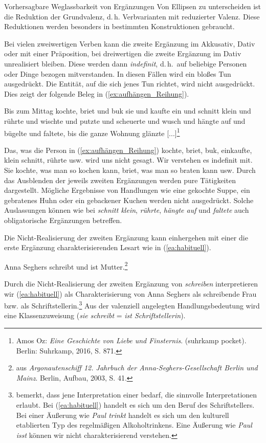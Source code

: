 \begin{Exkurs}{Vorhersagbare Weglassbarkeit von Ergänzungen}
Von Ellipsen zu unterscheiden ist die Reduktion der Grundvalenz, d.\,h. Verbvarianten mit reduzierter Valenz. Diese Reduktionen werden besonders in bestimmten Konstruktionen gebraucht.

Bei vielen zweiwertigen Verben kann die zweite Ergänzung im Akkusativ, Dativ oder mit einer Präposition, bei dreiwertigen die zweite Ergänzung im Dativ unrealisiert bleiben. Diese werden dann \textit{indefinit}, d.\,h.\ auf beliebige Personen oder Dinge bezogen mitverstanden. In diesen Fällen wird ein bloßes Tun ausgedrückt. Die Entität, auf die sich jenes Tun richtet, wird nicht ausgedrückt. Dies zeigt der folgende Beleg in (\ref{ex:aufhängen_Reihung}).

\ea \label{ex:aufhängen_Reihung} Bis zum Mittag kochte, briet und buk sie und kaufte ein und schnitt klein und rührte und wischte und putzte und scheuerte und wusch und hängte auf und bügelte und faltete, bis die ganze Wohnung glänzte [...]\footnote{Amos Oz: \textit{Eine Geschichte von Liebe und Finsternis}. (suhrkamp pocket). Berlin: Suhrkamp, 2016, S. 871.}
\z 

Das, was die Person in (\ref{ex:aufhängen_Reihung}) kochte, briet, buk, einkaufte, klein schnitt, rührte usw. wird uns nicht gesagt. Wir verstehen es indefinit mit. Sie kochte, was man so kochen kann, briet, was man so braten kann usw. Durch das Ausblenden der jeweils zweiten Ergänzungen werden pure Tätigkeiten dargestellt. Mögliche Ergebnisse von Handlungen wie eine gekochte Suppe, ein gebratenes Huhn oder ein gebackener Kuchen werden nicht ausgedrückt. Solche Auslassungen können wie bei \textit{schnitt klein}, \textit{rührte}, \textit{hängte auf} und \textit{faltete} auch obligatorische Ergänzungen betreffen.  

Die Nicht-Realisierung der zweiten Ergänzung kann einhergehen mit einer die erste Ergänzung charakterisierenden Lesart wie in (\ref{ea:habituell}).

\ea \label{ea:habituell} Anna Seghers schreibt und ist Mutter.\footnote{aus \textit{Argonautenschiff 12. Jahrbuch der Anna-Seghers-Gesellschaft Berlin und Mainz}. Berlin, Aufbau, 2003, S. 41.}
\z 

Durch die Nicht-Realisierung der zweiten Ergänzung von \textit{schreiben} interpretieren wir (\ref{ea:habituell}) als Charakterisierung von Anna Seghers als schreibende Frau bzw. als Schriftstellerin.\footnote{\citet[255]{Agel2000} bemerkt, dass jene Interpretation einer  bedarf, die sinnvolle Interpretationen erlaubt. Bei (\ref{ea:habituell}) handelt es sich um den Beruf des Schriftstellers. Bei einer Äußerung wie \textit{Paul trinkt} handelt es sich um den kulturell etablierten Typ des regelmäßigen Alkoholtrinkens. Eine Äußerung wie \textit{Paul isst} können wir nicht charakterisierend verstehen.} Aus der valenziell angelegten Handlungsbedeutung wird eine Klassenzuweisung (\textit{sie schreibt} = \textit{ist Schriftstellerin}).


\end{Exkurs}
